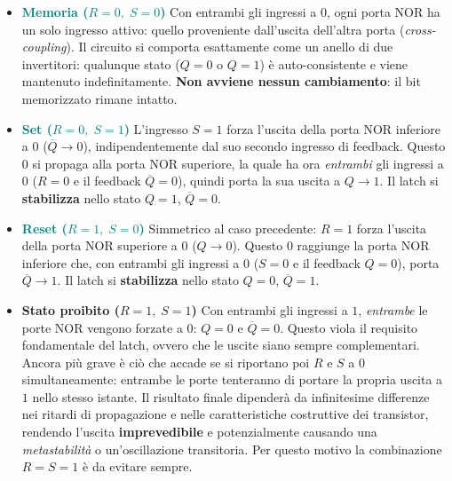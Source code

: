 \begin{itemize}[leftmargin=1.5em, itemsep=4pt]

    \item \textcolor{teal}{\textbf{Memoria ($R=0,\;S=0$)}}\quad
    Con entrambi gli ingressi a $0$, ogni porta NOR ha un solo ingresso attivo: quello proveniente
    dall'uscita dell'altra porta (\emph{cross-coupling}). Il circuito si comporta esattamente come
    un anello di due invertitori: qualunque stato ($Q=0$ o $Q=1$) è auto-consistente e viene
    mantenuto indefinitamente. \textbf{Non avviene nessun cambiamento}: il bit memorizzato rimane
    intatto.

    \item \textcolor{teal}{\textbf{Set ($R=0,\;S=1$)}}\quad
    L'ingresso $S=1$ forza l'uscita della porta NOR inferiore a $0$
    ($\overline{Q}\to 0$), indipendentemente dal suo secondo ingresso di feedback.
    Questo $0$ si propaga alla porta NOR superiore, la quale ha ora \emph{entrambi} gli ingressi
    a $0$ ($R=0$ e il feedback $\overline{Q}=0$), quindi porta la sua uscita a
    $Q\to 1$. Il latch si \textbf{stabilizza} nello stato $Q=1$, $\overline{Q}=0$.

    \item \textcolor{teal}{\textbf{Reset ($R=1,\;S=0$)}}\quad
    Simmetrico al caso precedente: $R=1$ forza l'uscita della porta NOR superiore a $0$
    ($Q\to 0$). Questo $0$ raggiunge la porta NOR inferiore che, con entrambi gli ingressi
    a $0$ ($S=0$ e il feedback $Q=0$), porta $\overline{Q}\to 1$.
    Il latch si \textbf{stabilizza} nello stato $Q=0$, $\overline{Q}=1$.

    \item \textcolor{red!70!black}{\textbf{Stato proibito ($R=1,\;S=1$)}}\quad
    Con entrambi gli ingressi a $1$, \emph{entrambe} le porte NOR vengono forzate
    a $0$: $Q=0$ e $\overline{Q}=0$. Questo viola il requisito fondamentale del latch,
    ovvero che le uscite siano sempre complementari. Ancora più grave è ciò che accade
    se si riportano poi $R$ e $S$ a $0$ simultaneamente: entrambe le porte
    tenteranno di portare la propria uscita a $1$ nello stesso istante.
    Il risultato finale dipenderà da infinitesime differenze nei ritardi di propagazione
    e nelle caratteristiche costruttive dei transistor, rendendo l'uscita
    \textbf{imprevedibile} e potenzialmente causando una \emph{metastabilità} o
    un'oscillazione transitoria. Per questo motivo la combinazione $R=S=1$ è da
    evitare sempre.

\end{itemize}

